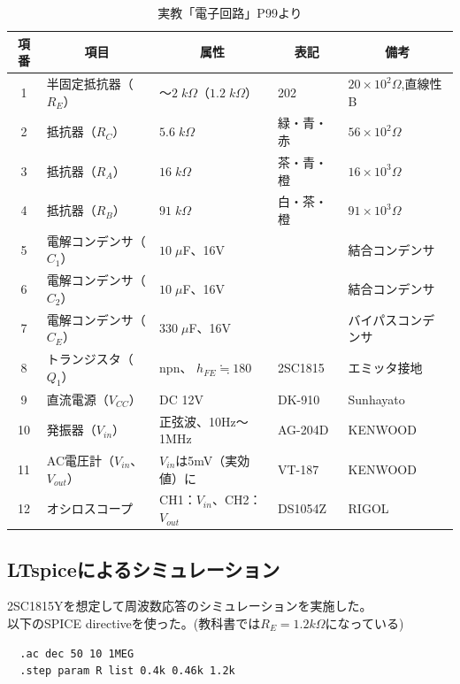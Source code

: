 \documentclass[uplatex,a4paper,11pt,oneside,openany]{jsbook}
\begin{document}
\begin{table}[H]
\begin{center}
\caption{実教「電子回路」P99より}
\begin{tabular}{|c|l|l|l|l|} \hline
  \multicolumn{1}{|c|}{\textbf{項番}} & \multicolumn{1}{c|}{\textbf{項目}} & \multicolumn{1}{c|}{\textbf{属性}} & \multicolumn{1}{c|}{\textbf{表記}} & \multicolumn{1}{c|}{\textbf{備考}} \\ \hline
  1 & 半固定抵抗器（$R_E$） & 〜$2\;k\Omega$（$1.2\;k\Omega$） & 202 & $20\times 10^2\Omega$,直線性B \\
  2 & 抵抗器（$R_C$） & $5.6\;k\Omega$ & 緑・青・赤 & $56\times 10^2\Omega$ \\
  3 & 抵抗器（$R_{A}$） & $16\;k\Omega$ & 茶・青・橙 & $16\times 10^3\Omega$ \\
  4 & 抵抗器（$R_{B}$） & $91\;k\Omega$ & 白・茶・橙 & $91\times 10^3\Omega$ \\
  5 & 電解コンデンサ（$C_1$） & $10\;\mu$F、16V & & 結合コンデンサ \\
  6 & 電解コンデンサ（$C_2$） & $10\;\mu$F、16V & & 結合コンデンサ \\
  7 & 電解コンデンサ（$C_E$） & $330\;\mu$F、16V & & バイパスコンデンサ \\
  8 & トランジスタ（$Q_1$） & npn、 $h_{FE}\fallingdotseq180$ & 2SC1815\footnotemark & エミッタ接地 \\ \hline
  9 & 直流電源（$V_{CC}$） & DC 12V & DK-910 & Sunhayato \\
  10 & 発振器（$V_{in}$） & 正弦波、10Hz〜1MHz & AG-204D & KENWOOD \\
  11 & AC電圧計（$V_{in}$、$V_{out}$） & $V_{in}$は5mV（実効値）に & VT-187 & KENWOOD \\
  12 & オシロスコープ & CH1：$V_{in}$、CH2：$V_{out}$ & DS1054Z & RIGOL \\ \hline
\end{tabular}
\end{center}
\end{table}

\subsection{LTspiceによるシミュレーション}

2SC1815Yを想定して周波数応答のシミュレーションを実施した。\\
以下のSPICE directiveを使った。(教科書では$R_E=1.2k\Omega$になっている)
\begin{verbatim}
  .ac dec 50 10 1MEG
  .step param R list 0.4k 0.46k 1.2k
\end{verbatim}
\end{document}
